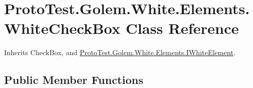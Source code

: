 \hypertarget{class_proto_test_1_1_golem_1_1_white_1_1_elements_1_1_white_check_box}{\section{Proto\-Test.\-Golem.\-White.\-Elements.\-White\-Check\-Box Class Reference}
\label{class_proto_test_1_1_golem_1_1_white_1_1_elements_1_1_white_check_box}
}


Inherits Check\-Box, and \hyperlink{interface_proto_test_1_1_golem_1_1_white_1_1_elements_1_1_i_white_element}{Proto\-Test.\-Golem.\-White.\-Elements.\-I\-White\-Element}.

\subsection*{Public Member Functions}
